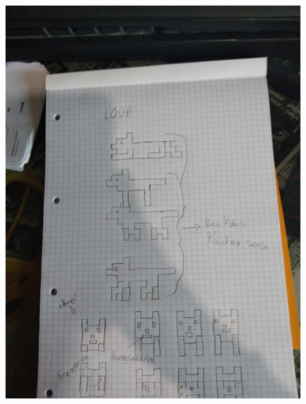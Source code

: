 \documentclass[a4paper, 11pt]{article}
\begin{document}
\begin{enumerate}
\begin{figure}[ht!]
\begin{minipage}[c]{.5\linewidth}
   \includegraphics[width=\linewidth]{images/loup.jpg}
  \end{minipage} \hfill
  \begin{minipage}[c]{.5\linewidth}
   \centering

\end{minipage}
\end{figure}
\end{enumerate}
\end{document}
